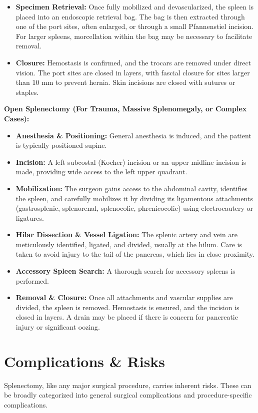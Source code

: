 \begin{itemize}
  \item \textbf{Specimen Retrieval:} Once fully mobilized and devascularized, the spleen is placed into an endoscopic retrieval bag. The bag is then extracted through one of the port sites, often enlarged, or through a small Pfannenstiel incision. For larger spleens, morcellation within the bag may be necessary to facilitate removal.
  \item \textbf{Closure:} Hemostasis is confirmed, and the trocars are removed under direct vision. The port sites are closed in layers, with fascial closure for sites larger than 10 mm to prevent hernia. Skin incisions are closed with sutures or staples.
\end{itemize}

\textbf{Open Splenectomy (For Trauma, Massive Splenomegaly, or Complex Cases):}
\begin{itemize}
  \item \textbf{Anesthesia \& Positioning:} General anesthesia is induced, and the patient is typically positioned supine.
  \item \textbf{Incision:} A left subcostal (Kocher) incision or an upper midline incision is made, providing wide access to the left upper quadrant.
  \item \textbf{Mobilization:} The surgeon gains access to the abdominal cavity, identifies the spleen, and carefully mobilizes it by dividing its ligamentous attachments (gastrosplenic, splenorenal, splenocolic, phrenicocolic) using electrocautery or ligatures.
  \item \textbf{Hilar Dissection \& Vessel Ligation:} The splenic artery and vein are meticulously identified, ligated, and divided, usually at the hilum. Care is taken to avoid injury to the tail of the pancreas, which lies in close proximity.
  \item \textbf{Accessory Spleen Search:} A thorough search for accessory spleens is performed.
  \item \textbf{Removal \& Closure:} Once all attachments and vascular supplies are divided, the spleen is removed. Hemostasis is ensured, and the incision is closed in layers. A drain may be placed if there is concern for pancreatic injury or significant oozing.
\end{itemize}

\section*{Complications \& Risks}
Splenectomy, like any major surgical procedure, carries inherent risks. These can be broadly categorized into general surgical complications and procedure-specific complications.

